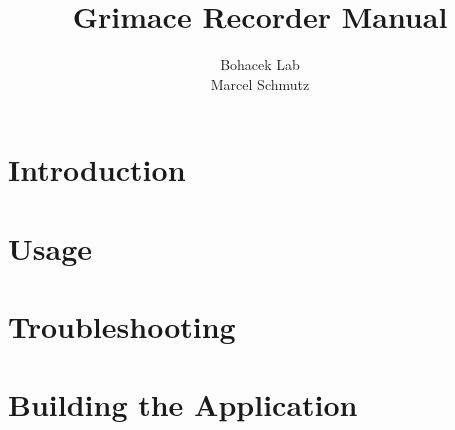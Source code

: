 \documentclass{ol-softwaremanual}
\title{Grimace Recorder Manual}
\author{Bohacek Lab\\Marcel Schmutz}
\begin{document}
\maketitle

\tableofcontents
\newpage

\section{Introduction}


\newpage

\section{Usage}



\section{Troubleshooting}



\section{Building the Application}


\end{document}
